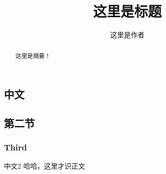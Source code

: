 \documentclass[10pt,a4paper]{article}
\title{这里是标题}
\author{这里是作者}
\begin{document}
\begin{CJK}{UTF8}{gbsn}
  \maketitle{}
  \begin{abstract}
    这里是摘要！
  \end{abstract}

  \tableofcontents{}
  \setcounter{tocdepth}{2}

  \newpage
  \section{中文}
  \subsection{第二节}
  \subsubsection{Third}
  \Huge{中文2}
  \normalsize{} 哈哈，这里才识正文
  \newpage

\end{CJK}
\end{document}
